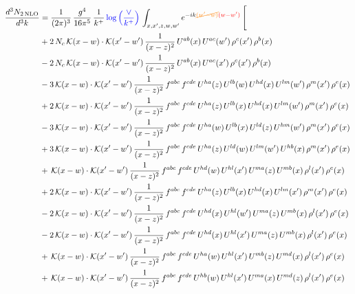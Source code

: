\documentclass[9pt]{article}
\numberwithin{equation}{section}
\begin{document}
\begin{align}
\frac{d^{3}N_{2\,\mathrm{NLO}}}{d^{3}k} & = \frac{1}{(2\pi)^{3}}\,\frac{g^{4}}{16\pi^{5}}\,\frac{1}{k^{+}}\,{\color{blue}\log{\left(\frac{\vee}{k^{+}}\right)}}\,\int_{x,x',z,w,w'}e^{-ik{\color{orange}\cancel{(w'-w)}}{\color{red}(w-w')}}\,\Bigg[
\notag\\ &+2\,N_{c}\,\mathcal{K}(x-w)\cdot\mathcal{K}(x'-w')\,\frac{1}{(x-z)^{2}}\,U^{ab}(x)\,U^{ac}(w')\,\rho^{c}(x')\,\rho^{b}(x)\notag\\
&-2\,N_{c}\,\mathcal{K}(x-w)\cdot\mathcal{K}(x'-w')\,\frac{1}{(x-z)^{2}}\,U^{ab}(x)\,U^{ac}(x')\,\rho^{c}(x')\,\rho^{b}(x)\notag\\
&-3\,\mathcal{K}(x-w)\cdot\mathcal{K}(x'-w')\,\frac{1}{(x-z)^{2}}\,f^{abc}\,f^{cde}\,U^{ha}(z)\,U^{lb}(w)\,U^{hd}(x)\,U^{lm}(w')\,\rho^{m}(x')\,\rho^{e}(x)\notag\\
&+2\,\mathcal{K}(x-w)\cdot\mathcal{K}(x'-w')\,\frac{1}{(x-z)^{2}}\,f^{abc}\,f^{cde}\,U^{ha}(z)\,U^{lb}(x)\,U^{hd}(x)\,U^{lm}(w')\,\rho^{m}(x')\,\rho^{e}(x)\notag\\
&-3\,\mathcal{K}(x-w)\cdot\mathcal{K}(x'-w')\,\frac{1}{(x-z)^{2}}\,f^{abc}\,f^{cde}\,U^{ha}(w)\,U^{lb}(x)\,U^{ld}(z)\,U^{hm}(w')\,\rho^{m}(x')\,\rho^{e}(x)\notag\\
&+3\,\mathcal{K}(x-w)\cdot\mathcal{K}(x'-w')\,\frac{1}{(x-z)^{2}}\,f^{abc}\,f^{cde}\,U^{ha}(z)\,U^{ld}(w)\,U^{lm}(w')\,U^{hb}(x)\,\rho^{m}(x')\,\rho^{e}(x)\notag\\
&+\,\mathcal{K}(x-w)\cdot\mathcal{K}(x'-w')\,\frac{1}{(x-z)^{2}}\,f^{abc}\,f^{cde}\,U^{hd}(w)\,U^{hl}(x')\,U^{ma}(z)\,U^{mb}(x)\,\rho^{l}(x')\,\rho^{e}(x)\notag\\
&+2\,\mathcal{K}(x-w)\cdot\mathcal{K}(x'-w')\,\frac{1}{(x-z)^{2}}\,f^{abc}\,f^{cde}\,U^{ha}(z)\,U^{lb}(x)\,U^{hd}(x)\,U^{lm}(x')\,\rho^{m}(x')\,\rho^{e}(x)\notag\\
&-2\,\mathcal{K}(x-w)\cdot\mathcal{K}(x'-w')\,\frac{1}{(x-z)^{2}}\,f^{abc}\,f^{cde}\,U^{hd}(x)\,U^{hl}(w')\,U^{ma}(z)\,U^{mb}(x)\,\rho^{l}(x')\,\rho^{e}(x)\notag\\
&-2\,\mathcal{K}(x-w)\cdot\mathcal{K}(x'-w')\,\frac{1}{(x-z)^{2}}\,f^{abc}\,f^{cde}\,U^{hd}(x)\,U^{hl}(x')\,U^{ma}(z)\,U^{mb}(x)\,\rho^{l}(x')\,\rho^{e}(x)\notag\\
&+\,\mathcal{K}(x-w)\cdot\mathcal{K}(x'-w')\,\frac{1}{(x-z)^{2}}\,f^{abc}\,f^{cde}\,U^{ha}(w)\,U^{hl}(x')\,U^{mb}(z)\,U^{md}(x)\,\rho^{l}(x')\,\rho^{e}(x)\notag\\
&+\,\mathcal{K}(x-w)\cdot\mathcal{K}(x'-w')\,\frac{1}{(x-z)^{2}}\,f^{abc}\,f^{cde}\,U^{hb}(w)\,U^{hl}(x')\,U^{ma}(x)\,U^{md}(z)\,\rho^{l}(x')\,\rho^{e}(x)\notag\\

\end{align}
\end{document}
